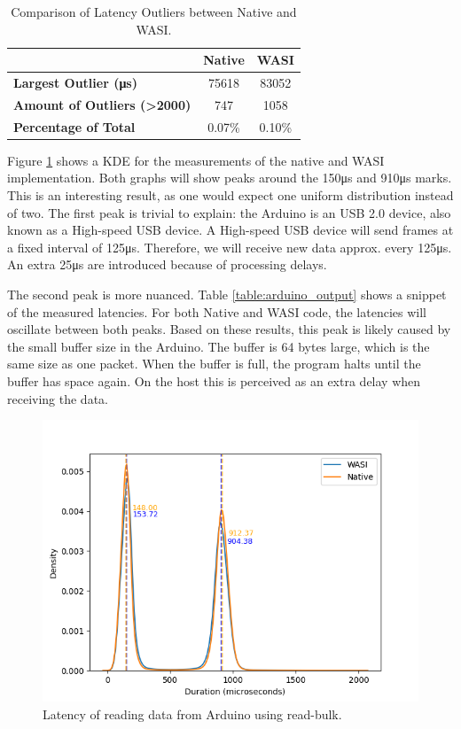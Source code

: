 \begin{table}[h]
\centering
\begin{tabular}{|l|c|c|}
\hline
 & \textbf{Native} & \textbf{WASI} \\ \hline
\textbf{Largest Outlier (μs)} & 75618 & 83052 \\ \hline
\textbf{Amount of Outliers (\textgreater 2000)} & 747 & 1058 \\ \hline
\textbf{Percentage of Total} & 0.07\% & 0.10\% \\ \hline
\end{tabular}
\caption{Comparison of Latency Outliers between Native and WASI.}
\label{table:latency_comparison}
\end{table}



Figure \ref{fig:arduino_reading_latency} shows a \acrfull{KDE} for the measurements of the native and \acrshort{WASI} implementation.
Both graphs will show peaks around the 150μs and 910μs marks. This is an interesting result, as one would expect one uniform distribution instead of two. The first peak is trivial to explain: the Arduino is an USB 2.0 device, also known as a High-speed USB device. A High-speed USB device will send frames at a fixed interval of 125μs. Therefore, we will receive new data approx. every 125μs. An extra 25μs are introduced because of processing delays. 

The second peak is more nuanced. Table \ref{table:arduino_output} shows a snippet of the measured latencies. For both Native and WASI code, the latencies will oscillate between both peaks. Based on these results, this peak is likely caused by the small buffer size in the Arduino. The buffer is 64 bytes large, which is the same size as one packet. When the buffer is full, the program halts until the buffer has space again. On the host this is perceived as an extra delay when receiving the data.

\begin{figure}[H]
  \centering
  \includegraphics[width=1\textwidth]{images/reading_data_latency.png}
  \caption{Latency of reading data from Arduino using read-bulk.}
  \label{fig:arduino_reading_latency}
\end{figure}

